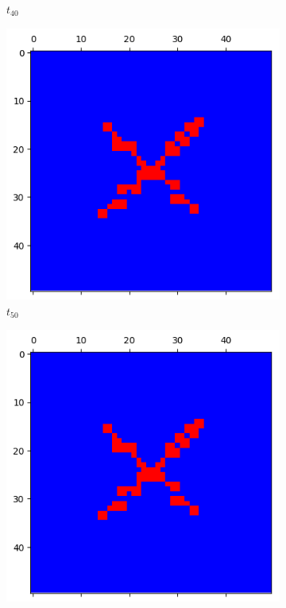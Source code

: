 \documentclass[letterpaper]{article}
\begin{document}
\begin{figure}[H]
\begin{subfigure}{.33\textwidth}
      \caption{$t_{40}$}
    \end{subfigure}
    \begin{subfigure}{.33\textwidth}
      \centering
      \includegraphics[width=1\linewidth]{images/assign2/part31-coop/t50}
      \caption{$t_{50}$}
    \end{subfigure}
    \begin{subfigure}{.33\textwidth}
      \centering
      \includegraphics[width=1\linewidth]{images/assign2/part31-coop/t60}

\end{subfigure}
\end{figure}
\end{document}
